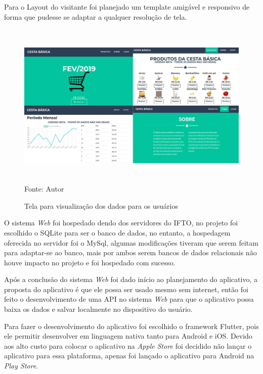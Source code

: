 \documentclass{ifto-tex}
\begin{document}
Para o Layout do visitante foi planejado um template amigável e responsivo de forma que pudesse se adaptar a qualquer resolução de tela.


\begin{figure}[!h]
	\begin{center}
		\includegraphics[width=16.0cm, height= 8.0cm]{cestauser.jpeg}    %
		Fonte: Autor
		\caption{Tela para visualização dos dados para os usuários} 
		\label{fig:faces}
	\end{center}
\end{figure}

O sistema \textit{Web} foi hospedado dendo dos servidores do IFTO, no projeto foi escolhido o SQLite para ser o banco de dados, no entanto, a hospedagem oferecida no servidor foi o MySql, algumas modificações tiveram que serem feitam para adaptar-se ao banco, mais por ambos serem bancos de dados relacionais não houve impacto no projeto e foi hospedado com sucesso.

Após a conclusão do sistema \textit{Web} foi dado início ao planejamento do aplicativo, a proposta do aplicativo é que ele possa ser usado mesmo sem internet, então foi feito o desenvolvimento de uma API no sistema \textit{Web} para que o aplicativo possa baixa os dados e salvar localmente no dispositivo do usuário.

Para fazer o desenvolvimento do aplicativo foi escolhido o framework Flutter, pois ele permitir desenvolver em linguagem nativa tanto para Android e iOS. Devido aos alto custo para colocar o aplicativo na \textit{Apple Store} foi decidido não lançar o aplicativo para essa plataforma, apenas foi lançado o aplicativo para Android na \textit{Play Store}.
\end{document}
